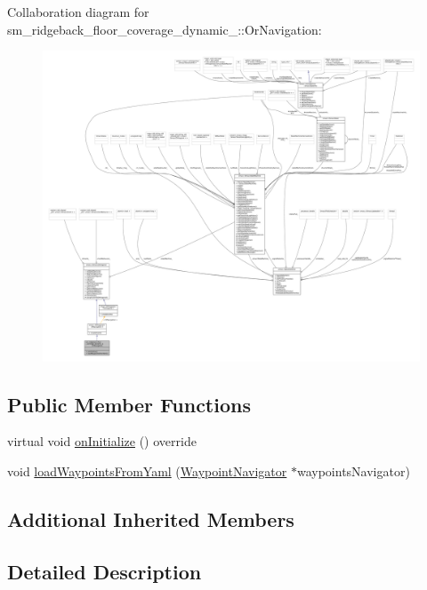 Collaboration diagram for sm\+\_\+ridgeback\+\_\+floor\+\_\+coverage\+\_\+dynamic\+\_\+:\+:Or\+Navigation\+:
\nopagebreak
\begin{figure}[H]
\begin{center}
\leavevmode
\includegraphics[width=350pt]{classsm__ridgeback__floor__coverage__dynamic__1_1_1OrNavigation__coll__graph}
\end{center}
\end{figure}
\subsection*{Public Member Functions}
\begin{DoxyCompactItemize}
\item 
virtual void \hyperlink{classsm__ridgeback__floor__coverage__dynamic__1_1_1OrNavigation_a4d090d426655e16dc668f48699d0f9c9}{on\+Initialize} () override
\item 
void \hyperlink{classsm__ridgeback__floor__coverage__dynamic__1_1_1OrNavigation_a4aa48f8ae2e850900e06ea10b472d6cf}{load\+Waypoints\+From\+Yaml} (\hyperlink{classcl__move__base__z_1_1WaypointNavigator}{Waypoint\+Navigator} $\ast$waypoints\+Navigator)
\end{DoxyCompactItemize}
\subsection*{Additional Inherited Members}


\subsection{Detailed Description}


